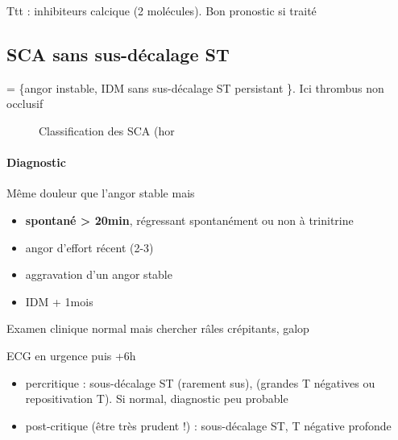 Ttt : inhibiteurs calcique (2 molécules).
Bon pronostic si traité

\subsection{SCA sans sus-décalage ST}

= \{angor instable, IDM sans sus-décalage ST persistant \}. Ici thrombus non
occlusif

\begin{figure}[htpb]
  \centering
  \caption{Classification des SCA (hor}
\end{figure}

\paragraph{Diagnostic}
Même douleur que l'angor stable mais 
\begin{itemize}
  \item \textbf{spontané > 20min}, régressant spontanément ou non à trinitrine
  \item angor d'effort récent (2-3)
  \item aggravation d'un angor stable
  \item IDM + 1mois
\end{itemize}
Examen clinique normal mais chercher râles crépitants, galop

ECG en urgence \skull puis +6h
\begin{itemize}
  \item percritique : sous-décalage ST (rarement sus), (grandes T négatives ou
    repositivation T). Si normal, diagnostic peu probable
  \item post-critique (être très prudent !) : sous-décalage ST, T négative
    profonde
\end{itemize}

